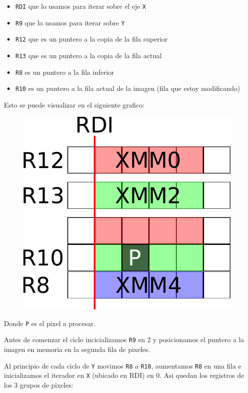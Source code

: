 \noindent
\begin{itemize}
\item \texttt{RDI} que lo usamos para iterar sobre el eje \texttt{X}
\item \texttt{R9} que lo usamos para iterar sobre \texttt{Y}
\item \texttt{R12} que es un puntero a la copia de la fila superior
\item \texttt{R13} que es un puntero a la copia de la fila actual
\item \texttt{R8} es un puntero a la fila inferior
\item \texttt{R10} es un puntero a la fila actual de la imagen (fila que estoy modificando)
\end{itemize}

Esto se puede visualizar en el siguiente grafico:

\begin{figure}[h!]
	\centering
	\includegraphics[scale=0.5]{images/BlurASM1_0}
\end{figure}

Donde \texttt{P} es el pixel a procesar.

Antes de comenzar el ciclo incicializamos \texttt{R9} en 2 y posicionamos el puntero a la imagen en memoria en la segunda fila de pixeles.

Al principio de cada ciclo de \texttt{Y} movimos \texttt{R8} a \texttt{R10}, aumentamos \texttt{R8} en una fila e inicializamos el iterador en \texttt{X} (ubicado en RDI) en 0. Asi quedan los registros de los 3 grupos de pixeles:\\

